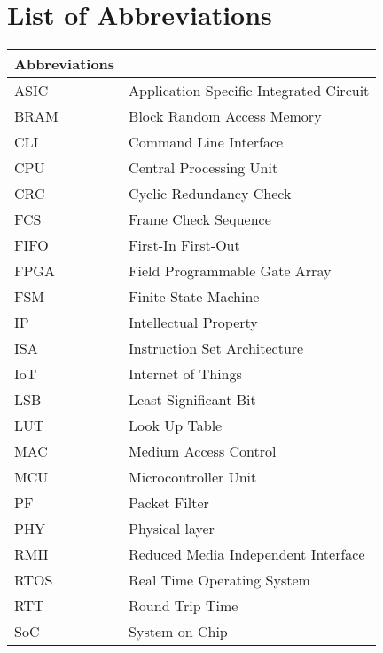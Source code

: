 


\clearpage
\pagestyle{headings}

\chapter[List of Abbreviations ]{List of Abbreviations}


\begin{center}
	\small
	\begin{longtable}{ll}
	\toprule
	Abbreviations & {} \\
	\bottomrule
	
	ASIC				& Application Specific Integrated Circuit \\
	BRAM			& Block Random Access Memory \\
	CLI				& Command Line Interface \\
	CPU				& Central Processing Unit \\
	CRC				& Cyclic Redundancy Check \\
	FCS 				& Frame Check Sequence \\
	FIFO			& First-In First-Out \\
	FPGA				& Field Programmable Gate Array \\
	FSM				& Finite State Machine \\
	IP				& Intellectual Property \\
	ISA				& Instruction Set Architecture \\
	IoT				& Internet of Things \\
	LSB				& Least Significant Bit \\
	LUT 			& Look Up Table \\
	MAC				& Medium Access Control \\
	MCU  	        & Microcontroller Unit \\
	PF				& Packet Filter \\
	PHY				& Physical layer \\
	RMII			& Reduced Media Independent Interface \\
	RTOS			& Real Time Operating System \\
	RTT				& Round Trip Time \\
	SoC				& System on Chip \\
	\hline 
	\end{longtable}
\end{center}

